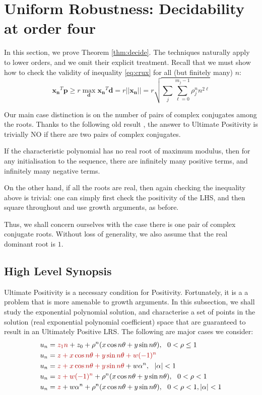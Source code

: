 \section{Uniform Robustness: Decidability at order four}
\label{section:decidability}
In this section, we prove Theorem \ref{thm:decide}. The techniques naturally apply to lower orders, and we omit their explicit treatment. Recall that we must show how to check the validity of inequality \ref{eq:crux} for all (but finitely many) $n$:
$$
\mathbf{x_n}^T\mathbf{p} \ge r\max_{\mathbf{d}}\mathbf{x_n}^T\mathbf{d} = r ||\mathbf{x_n}|| = r \sqrt{\sum_{j} \sum_{\ell=0}^{m_j-1} \rho_j^n n^{2\ell}}
$$

Our main case distinction is on the number of pairs of complex conjugates among the roots. Thanks to the following old result \cite[Thm. 2]{positive-dominant}, the answer to Ultimate Positivity is trivially NO if there are two pairs of complex conjugates.

\begin{proposition}[Folklore]
\label{prop:folklore}
If the characteristic polynomial has no real root of maximum modulus, then for any initialisation to the sequence, there are infinitely many positive terms, and infinitely many negative terms.
\end{proposition}

On the other hand, if all the roots are real, then again checking the inequality above is trivial: one can simply first check the positivity of the LHS, and then square throughout and use growth arguments, as before. 

Thus, we shall concern ourselves with the case there is one pair of complex conjugate roots. Without loss of generality, we also assume that the real dominant root is $1$.

\subsection{High Level Synopsis}
Ultimate Positivity is a necessary condition for Positivity. Fortunately, it is a a problem that is more amenable to growth arguments. In this subsection, we shall study the exponential polynomial solution, and characterise a set of points in the solution (real exponential polynomial coefficient) space that are guaranteed to result in an Ultimately Positive LRS. The following are major cases we consider:
\begin{align}
\label{eq:unityrep}
u_n &= {\color{red!70!black} z_1 n} + z_0 + \rho^n (x \cos n\theta + y \sin n \theta), ~~ 0< \rho \le 1 \\
\label{eq:fourdom}
u_n &= {\color{red!70!black} z + x\cos n\theta + y\sin n\theta + w(-1)^n} \\
\label{eq:threedom}
u_n &= {\color{red!70!black} z + x\cos n\theta + y\sin n\theta} + w\alpha^n, ~~|\alpha| < 1 \\
\label{eq:twodom}
u_n &= {\color{red!70!black}z + w(-1)^n} + \rho^n(x\cos n\theta + y\sin n\theta), ~~ 0< \rho < 1 \\
\label{eq:onedom}
u_n &= {\color{red!70!black}z} + w\alpha^n + \rho^n(x\cos n\theta + y\sin n\theta), ~~ 0< \rho < 1, |\alpha| < 1
\end{align}

